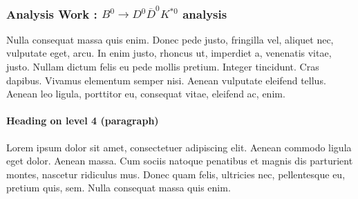 \documentclass[paper=a4, fontsize=10pt]{scrartcl}
\numberwithin{equation}{section}		%
\numberwithin{figure}{section}			%
\numberwithin{table}{section}				%
\begin{document}

\subsubsection{Analysis Work : $B^{0}\rightarrow D^{0}\overline{D}^{0}K^{\ast 0}$ analysis}
Nulla consequat massa quis enim. Donec pede justo, fringilla vel, aliquet nec, vulputate eget, arcu. In enim justo, rhoncus ut, imperdiet a, venenatis vitae, justo. Nullam dictum felis eu pede mollis pretium. Integer tincidunt. Cras dapibus. Vivamus elementum semper nisi. Aenean vulputate eleifend tellus. Aenean leo ligula, porttitor eu, consequat vitae, eleifend ac, enim.

\paragraph{Heading on level 4 (paragraph)}
Lorem ipsum dolor sit amet, consectetuer adipiscing elit. Aenean commodo ligula eget dolor. Aenean massa. Cum sociis natoque penatibus et magnis dis parturient montes, nascetur ridiculus mus. Donec quam felis, ultricies nec, pellentesque eu, pretium quis, sem. Nulla consequat massa quis enim. 
\end{document}
